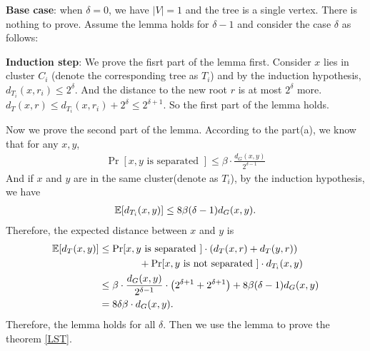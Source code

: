 \begin{answer}
\begin{enumerate}[label=\alph*).]
        \textbf{Base case}: when $\delta = 0$, we have $|V| = 1$ and the tree is a single vertex. There is nothing to prove.
        Assume the lemma holds for $\delta - 1$ and consider the case $\delta$ as follows:
        
        \textbf{Induction step}: We prove the fisrt part of the lemma first.
            Consider $x$ lies in cluster $C_i$ (denote the corresponding tree as $T_i$) and by the induction hypothesis, $d_{T_i}(x, r_i) \le 2^{\delta}$. 
            And the distance to the new root $r$ is at most $2^{\delta}$ more. $d_{T}(x, r) \le d_{T_i}(x, r_i) + 2^{\delta} \le 2^{\delta + 1}$.
            So the first part of the lemma holds.

            Now we prove the second part of the lemma. According to the part(a), we know that for any $x, y$, 
            \begin{align*}
                \Pr[x, y \text{ is separated }] \le \beta\cdot \frac{d_{G}(x,y)}{2^{\delta-1}}
            \end{align*}
            And if $x$ and $y$ are in the same cluster(denote as $T_i$), by the induction hypothesis, we have
            \begin{align*}
                \operatorname*{\mathbb{E}}[d_{T_i}(x,y)] \le 8\beta(\delta - 1) d_{G}(x,y).
            \end{align*}
            Therefore, the expected distance between $x$ and $y$ is
            \begin{align*}
                \operatorname*{\mathbb{E}}[d_T(x,y)] &\le \Pr[x, y \text{ is separated }] \cdot (d_T(x, r) + d_T(y, r)) \\
                & \quad \quad \quad \quad + \Pr[x, y \text{ is not separated }] \cdot d_{T_i}(x,y) \\
                &\le \beta\cdot \frac{d_{G}(x,y)}{2^{\delta-1}} \cdot \left(2^{\delta + 1} + 2^{\delta + 1}\right) + 8\beta(\delta - 1) d_G(x,y) \\
                &= 8\delta\beta\cdot d_G(x,y).
            \end{align*}
            Therefore, the lemma holds for all $\delta$. Then we use the lemma to prove the theorem \ref{LST}. 
            

\end{enumerate}
\end{answer}
